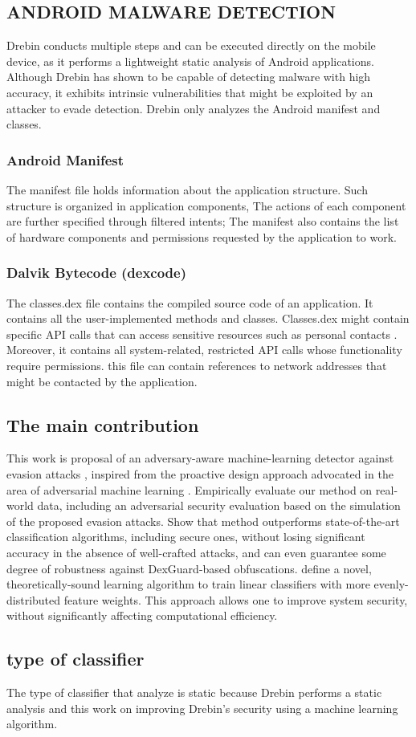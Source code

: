 \documentclass{article}
\begin{document}
\begin{multicols}{2}
\subsection{ANDROID MALWARE DETECTION}
Drebin conducts multiple steps and can be executed directly
on the mobile device, as it performs a lightweight static
analysis of Android applications.
Although Drebin has shown to be capable of detecting malware with high accuracy, it exhibits intrinsic vulnerabilities
that might be exploited by an attacker to evade detection.
Drebin only analyzes the Android manifest and classes.
\subsubsection{Android Manifest}
The manifest file holds information
about the application structure. Such structure is organized
in application components,  The actions of each component are further specified through filtered intents;  The manifest also contains the list of hardware components and permissions
requested by the application to work.
\subsubsection{Dalvik Bytecode (dexcode)}
The classes.dex file contains the compiled source code of an application. It contains all the user-implemented methods and classes. Classes.dex might contain specific API calls that can access sensitive resources such as personal contacts . Moreover, it contains all system-related, restricted API calls whose functionality require permissions.
 this file can contain references to network addresses that might be contacted by the application.


\subsection{The main contribution}
This work is proposal of an adversary-aware machine-learning detector against evasion attacks , inspired from the proactive design approach advocated in the area of adversarial machine learning . Empirically evaluate our method on real-world data, including an adversarial security evaluation based
on the simulation of the proposed evasion attacks. Show
that method outperforms state-of-the-art classification
algorithms, including secure ones, without losing significant
accuracy in the absence of well-crafted attacks, and can even
guarantee some degree of robustness against DexGuard-based obfuscations. 
define a novel, theoretically-sound learning algorithm to train linear classifiers with more evenly-distributed
feature weights. This approach allows one to improve system security, without significantly affecting computational efficiency.


\subsection{type of classifier}
The type of classifier that analyze is static because Drebin performs a static analysis and this work on improving Drebin's security using a machine learning algorithm.

\end{multicols}
\end{document}
